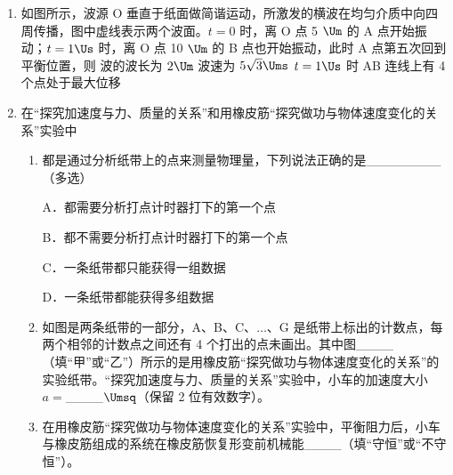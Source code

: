 \documentclass[\gkver]{gaokaozhenti}
\begin{document}
\begin{enumerate}
\item
如图所示，波源 O 垂直于纸面做简谐运动，所激发的横波在均匀介质中向四周传播，图中虚线表示两个波面。$t=0$ 时，离 O 点 5 $\Um$ 的 A 点开始振动；$t=1\Us$ 时，离 O 点 10 $\Um$ 的 B 点也开始振动，此时 A 点第五次回到平衡位置，则
\onepicture[w=5cm]{}
{波的波长为 $2\Um$}
{波速为 $5\sqrt 3\Ums$}
{$t=1\Us$ 时 AB 连线上有 4 个点处于最大位移}

\item
在“探究加速度与力、质量的关系”和用橡皮筋“探究做功与物体速度变化的关系”实验中
\begin{enumerate}
	\item
	都是通过分析纸带上的点来测量物理量，下列说法正确的是\_\_\_\_\_\_\_\_（多选）

	A．都需要分析打点计时器打下的第一个点

	B．都不需要分析打点计时器打下的第一个点

	C．一条纸带都只能获得一组数据

	D．一条纸带都能获得多组数据

	\item
	如图是两条纸带的一部分，A、B、C、$\ldots$、G 是纸带上标出的计数点，每两个相邻的计数点之间还有 4 个打出的点未画出。其中图\_\_\_\_（填“甲”或“乙”）所示的是用橡皮筋“探究做功与物体速度变化的关系”的实验纸带。“探究加速度与力、质量的关系”实验中，小车的加速度大小 $a=$\_\_\_\_$\Umsq$（保留 2 位有效数字）。
	\item
	在用橡皮筋“探究做功与物体速度变化的关系”实验中，平衡阻力后，小车与橡皮筋组成的系统在橡皮筋恢复形变前机械能\_\_\_\_（填“守恒”或“不守恒”）。
\end{enumerate}
\end{enumerate}
\end{document}
